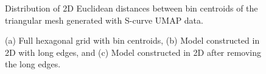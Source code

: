 \documentclass[
  12pt]{article}
\begin{document}
\begin{figure}[H]


\caption{\label{fig-distScurve}Distribution of 2D Euclidean distances
between bin centroids of the triangular mesh generated with S-curve UMAP
data.}

\end{figure}%

\begin{figure}[H]


\caption{\label{fig-modelScurve}(a) Full hexagonal grid with bin
centroids, (b) Model constructed in 2D with long edges, and (c) Model
constructed in 2D after removing the long edges.}

\end{figure}%
\end{document}
